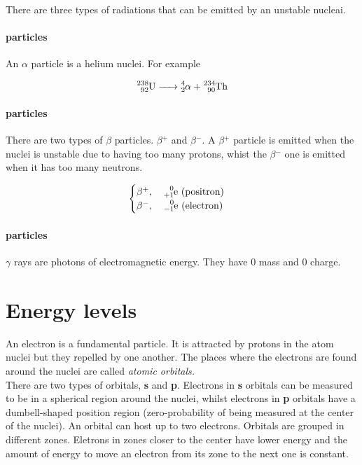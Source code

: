\documentclass{article}
\begin{document}
There are three types of radiations that can be emitted by an unstable nucleai.

\paragraph{\alpha{} particles}

An \(\alpha\) particle is a helium nuclei. For example

\[
    \ce{^238_92U -> ^4_2\alpha{} + ^234_90Th}
\]

\paragraph{\beta{} particles}

There are two types of \(\beta{}\) particles. \(\beta{}^+\) and \(\beta{}^-\).
A \(\beta{}^+\) particle is emitted when the nuclei is unstable due to
having too many protons, whist the \(\beta{}^-\) one is emitted when it has
too many neutrons.

\[
    \begin{cases}
        \beta{}^+,\quad \ce{^0_{+1}e} \text{ (positron)} \\
        \beta{}^-,\quad \ce{^0_{-1}e} \text{ (electron)}
    \end{cases}
\]

\paragraph{\gamma{} particles}

\(\gamma\) rays are photons of electromagnetic energy. They have \(0\) mass and \(0\) charge.

\pagebreak

\section{Energy levels}

An electron is a fundamental particle. It is attracted by protons in the
atom nuclei but they repelled by one another.
The places where the electrons are found around the nuclei are called
\textit{atomic orbitals.} \\
There are two types of orbitals, \textbf{s} and \textbf{p}.
Electrons in \textbf{s} orbitals can be measured to be in a spherical region around the nuclei,
whilst electrons in \textbf{p} orbitals have a dumbell-shaped position region
(zero-probability of being measured at the center of the nuclei).
An orbital can host up to two electrons.
Orbitals are grouped in different zones.
Eletrons in zones closer to the center have lower energy and the amount of energy
to move an electron from its zone to the next one is constant.
\end{document}

